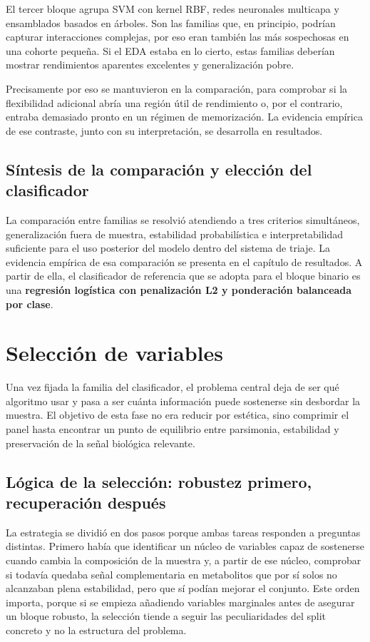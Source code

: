 El tercer bloque agrupa SVM con kernel RBF, redes neuronales multicapa y ensamblados basados en árboles. Son las
familias que, en principio, podrían capturar interacciones complejas, por eso eran también las más
sospechosas en una cohorte pequeña. Si el EDA estaba en lo cierto, estas familias deberían mostrar rendimientos
aparentes excelentes y generalización pobre.

Precisamente por eso se mantuvieron en la comparación, para comprobar si la flexibilidad adicional abría una región útil
de rendimiento o, por el contrario, entraba demasiado pronto en un régimen de memorización. La evidencia empírica de ese
contraste, junto con su interpretación, se desarrolla en resultados.

\subsection{Síntesis de la comparación y elección del clasificador}

La comparación entre familias se resolvió atendiendo a tres criterios simultáneos, generalización fuera de muestra,
estabilidad probabilística e interpretabilidad suficiente para el uso posterior del modelo dentro del sistema de triaje.
La evidencia empírica de esa comparación se presenta en el capítulo de resultados. A partir de ella, el clasificador de
referencia que se adopta para el bloque binario es una \textbf{regresión logística con penalización L2 y ponderación
balanceada por clase}.

\section{Selección de variables}\label{sec:seleccion_variables}

Una vez fijada la familia del clasificador, el problema central deja de ser qué algoritmo usar y pasa a ser cuánta información puede sostenerse sin desbordar la muestra. El objetivo de esta fase no era reducir por estética, sino comprimir el panel hasta encontrar un punto de equilibrio entre parsimonia, estabilidad y preservación de la señal biológica relevante.

\subsection{Lógica de la selección: robustez primero, recuperación después}

La estrategia se dividió en dos pasos porque ambas tareas responden a preguntas distintas. Primero había que identificar
un núcleo de variables capaz de sostenerse cuando cambia la composición de la muestra y, a partir de ese núcleo,
comprobar si todavía quedaba señal complementaria en metabolitos que por sí solos no alcanzaban plena estabilidad, pero
que sí podían mejorar el conjunto. Este orden importa, porque si se empieza añadiendo variables marginales antes de
asegurar un bloque robusto, la selección tiende a seguir las peculiaridades del split concreto y no la estructura del
problema.

